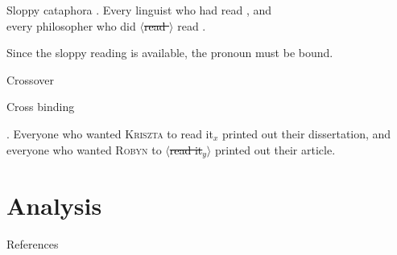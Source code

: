 \documentclass{beamer}
\newcommand{\elide}[1]{\textcolor{red!60}{$\langle$\sout{\textcolor{black}{#1}}$\rangle$}}
\begin{document}
\begin{frame}{Sloppy cataphora}
  \ex.
  Every {\sc linguist} who had  read , and\\
  every {\sc philosopher} who did \elide{read } read .

Since the sloppy reading is available, the pronoun must be bound.


\end{frame}

\begin{frame}{Crossover}


\end{frame}

\begin{frame}{Cross binding}

\ex. Everyone who wanted \textsc{Kriszta} to read it$_x$ printed out their dissertation, and\\
everyone who wanted \textsc{Robyn} to \elide{read it$_y$} printed out their article.

\end{frame}


\section{Analysis}



\begin{frame}[allowframebreaks]{References}

  \printbibliography[heading=none]

\end{frame}
\end{document}
